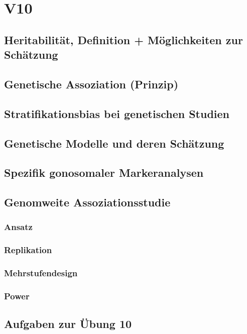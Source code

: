 \section{V10}
\subsection{Heritabilität, Definition + Möglichkeiten zur Schätzung}

\subsection{Genetische Assoziation (Prinzip)}

\subsection{Stratifikationsbias bei genetischen Studien}

\subsection{Genetische Modelle und deren Schätzung}

\subsection{Spezifik gonosomaler Markeranalysen}

\subsection{Genomweite Assoziationsstudie}

\subsubsection{Ansatz}

\subsubsection{Replikation}

\subsubsection{Mehrstufendesign}

\subsubsection{Power}

\subsection{Aufgaben zur Übung 10}